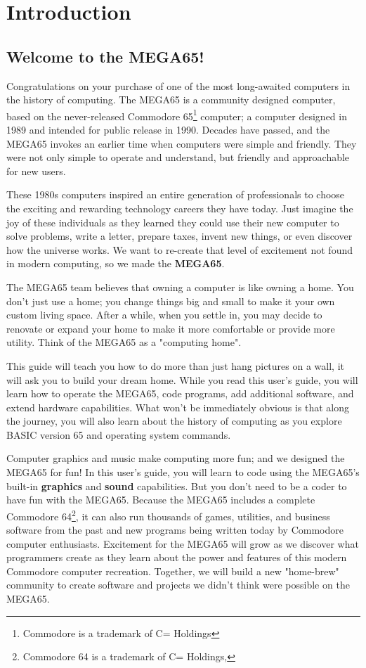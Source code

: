 \chapter{Introduction}

\section{Welcome to the MEGA65!}

Congratulations on your purchase of one of the most long-awaited computers in the history of computing. The MEGA65 is a community designed computer, based on the never-released Commodore{\textregistered} 65\footnote{Commodore is a trademark of C= Holdings} computer; a computer designed in 1989 and intended for public release in 1990. Decades have passed, and the MEGA65 invokes an earlier time when computers were simple and friendly. They were not only simple to operate and understand, but friendly and approachable for new users.

These 1980s computers inspired an entire generation of professionals to choose the exciting and rewarding technology careers they have today. Just imagine the joy of these individuals as they learned they could use their new computer to solve problems, write a letter, prepare taxes, invent new things, or even discover how the universe works. We want to re-create that level of excitement not found in modern computing, so we made the {\bf MEGA65}.

The MEGA65 team believes that owning a computer is like owning a home. You don't just use a home; you change things big and small to make it your own custom living space. After a while, when you settle in, you may decide to renovate or expand your home to make it more comfortable or provide more utility. Think of the MEGA65 as a "computing home".

This guide will teach you how to do more than just hang pictures on a wall, it will ask you to build your dream home. While you read this user's guide, you will learn how to operate the MEGA65, code programs, add additional software, and extend hardware capabilities. What won't be immediately obvious is that along the journey, you will also learn about the history of computing as you explore BASIC version 65 and operating system commands.

Computer graphics and music make computing more fun; and we designed the MEGA65 for fun! In this user's guide, you will learn to code using the MEGA65's built-in {\bf graphics} and {\bf sound} capabilities. But you don't need to be a coder to have fun with the MEGA65. Because the MEGA65 includes a complete Commodore{\textregistered} 64{\texttrademark}\footnote{Commodore 64 is a trademark of C= Holdings,}, it can also run thousands of games, utilities, and business software from the past and new programs being written today by Commodore computer enthusiasts. Excitement for the MEGA65 will grow as we discover what programmers create as they learn about the power and features of this modern Commodore computer recreation. Together, we will build a new "home-brew" community to create software and projects we didn't think were possible on the MEGA65.

